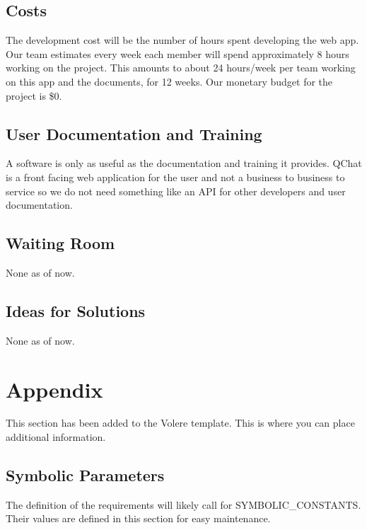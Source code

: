 \documentclass[12pt, titlepage]{article}
\begin{document}
\subsection{Costs}
The development cost will be the number of hours spent developing the web app. Our team estimates every week each member will spend approximately 8 hours working on the project. This amounts to about 24 hours/week per team working on this app and the documents, for 12 weeks. Our monetary budget for the project is \$0.

\subsection{User Documentation and Training}
A software is only as useful as the documentation and training it provides. QChat is a front facing web application for the user and not a business to business to service so we do not need something like an API for other developers and user documentation.

\subsection{Waiting Room}
None as of now.


\subsection{Ideas for Solutions}
None as of now.

\newpage





\newpage

\section{Appendix}

This section has been added to the Volere template.  This is where you can place
additional information.

\subsection{Symbolic Parameters}

The definition of the requirements will likely call for SYMBOLIC\_CONSTANTS.
Their values are defined in this section for easy maintenance.
\end{document}
